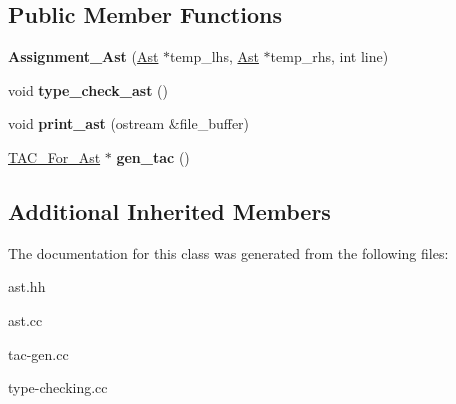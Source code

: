 \subsection*{Public Member Functions}
\begin{DoxyCompactItemize}
\item 
\mbox{\label{classAssignment__Ast_a318c262a2585ec46368d8062a6e00b08}} 
{\bfseries Assignment\+\_\+\+Ast} (\hyperlink{classAst}{Ast} $\ast$temp\+\_\+lhs, \hyperlink{classAst}{Ast} $\ast$temp\+\_\+rhs, int line)
\item 
\mbox{\label{classAssignment__Ast_af58349349db55986abab06d642eefc83}} 
void {\bfseries type\+\_\+check\+\_\+ast} ()
\item 
\mbox{\label{classAssignment__Ast_a7d828e4bdd578dea0e47ef525022900e}} 
void {\bfseries print\+\_\+ast} (ostream \&file\+\_\+buffer)
\item 
\mbox{\label{classAssignment__Ast_a03043287ac465a7db828ae758f7cc72d}} 
\hyperlink{classTAC__For__Ast}{T\+A\+C\+\_\+\+For\+\_\+\+Ast} $\ast$ {\bfseries gen\+\_\+tac} ()
\end{DoxyCompactItemize}
\subsection*{Additional Inherited Members}


The documentation for this class was generated from the following files\+:\begin{DoxyCompactItemize}
\item 
ast.\+hh\item 
ast.\+cc\item 
tac-\/gen.\+cc\item 
type-\/checking.\+cc\end{DoxyCompactItemize}
